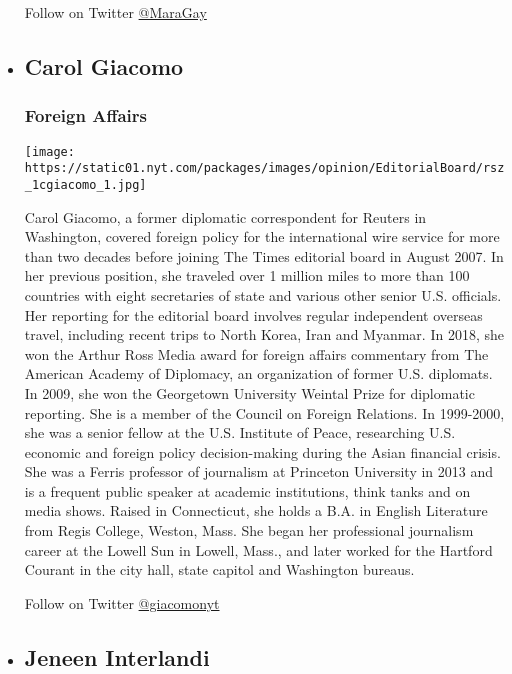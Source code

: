 \begin{itemize}
  Follow on Twitter \href{http://twitter.com/MaraGay}{@MaraGay}
\item
  \hypertarget{carol-giacomo}{%
  \subsection{Carol Giacomo}\label{carol-giacomo}}

  \hypertarget{foreign-affairs}{%
  \subsubsection{Foreign Affairs}\label{foreign-affairs}}

  \texttt{[image: https://static01.nyt.com/packages/images/opinion/EditorialBoard/rsz\_1cgiacomo\_1.jpg]}

  Carol Giacomo, a former diplomatic correspondent for Reuters in
  Washington, covered foreign policy for the international wire service
  for more than two decades before joining The Times editorial board in
  August 2007. In her previous position, she traveled over 1 million
  miles to more than 100 countries with eight secretaries of state and
  various other senior U.S. officials. Her reporting for the editorial
  board involves regular independent overseas travel, including recent
  trips to North Korea, Iran and Myanmar. In 2018, she won the Arthur
  Ross Media award for foreign affairs commentary from The American
  Academy of Diplomacy, an organization of former U.S. diplomats. In
  2009, she won the Georgetown University Weintal Prize for diplomatic
  reporting. She is a member of the Council on Foreign Relations. In
  1999-2000, she was a senior fellow at the U.S. Institute of Peace,
  researching U.S. economic and foreign policy decision-making during
  the Asian financial crisis. She was a Ferris professor of journalism
  at Princeton University in 2013 and is a frequent public speaker at
  academic institutions, think tanks and on media shows. Raised in
  Connecticut, she holds a B.A. in English Literature from Regis
  College, Weston, Mass. She began her professional journalism career at
  the Lowell Sun in Lowell, Mass., and later worked for the Hartford
  Courant in the city hall, state capitol and Washington bureaus.

  Follow on Twitter \href{http://twitter.com/giacomonyt}{@giacomonyt}
\item
  \hypertarget{jeneen-interlandi}{%
  \subsection{Jeneen Interlandi}\label{jeneen-interlandi}}


\end{itemize}
